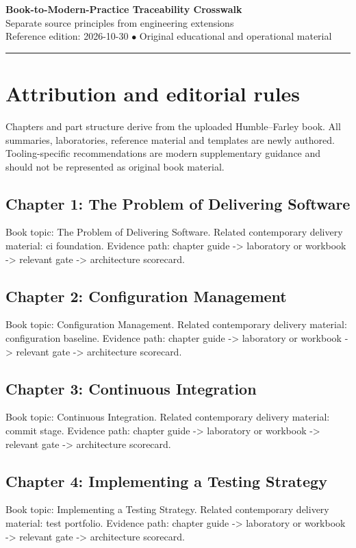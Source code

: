 \documentclass[10pt,letterpaper]{article}
\begin{document}
\begin{center}
{\LARGE\bfseries\color{cdblue}Book-to-Modern-Practice Traceability Crosswalk}\\[7pt]
{\large Separate source principles from engineering extensions}\\[6pt]
{\small Reference edition: 2026-10-30 $\bullet$ Original educational and operational material}
\end{center}
\noindent\color{cdblue}\rule{\linewidth}{1.2pt}\color{black}
\vspace{0.4em}
\section{Attribution and editorial rules}
Chapters and part structure derive from the uploaded Humble--Farley book. All summaries, laboratories, reference material and templates are newly authored. Tooling-specific recommendations are modern supplementary guidance and should not be represented as original book material.


\subsection{Chapter 1: The Problem of Delivering Software}
Book topic: The Problem of Delivering Software. Related contemporary delivery material: ci foundation. Evidence path: chapter guide -> laboratory or workbook -> relevant gate -> architecture scorecard.


\subsection{Chapter 2: Configuration Management}
Book topic: Configuration Management. Related contemporary delivery material: configuration baseline. Evidence path: chapter guide -> laboratory or workbook -> relevant gate -> architecture scorecard.


\subsection{Chapter 3: Continuous Integration}
Book topic: Continuous Integration. Related contemporary delivery material: commit stage. Evidence path: chapter guide -> laboratory or workbook -> relevant gate -> architecture scorecard.


\subsection{Chapter 4: Implementing a Testing Strategy}
Book topic: Implementing a Testing Strategy. Related contemporary delivery material: test portfolio. Evidence path: chapter guide -> laboratory or workbook -> relevant gate -> architecture scorecard.
\end{document}
